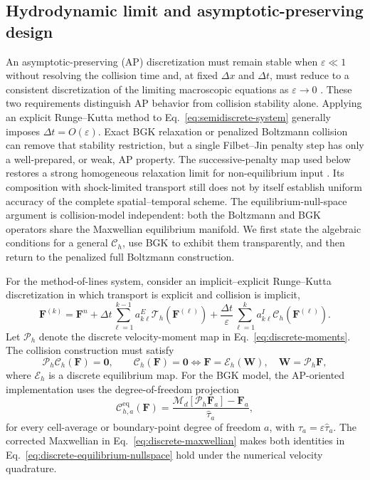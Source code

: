 \documentclass[preprint,3p,12pt]{elsarticle}
\newcommand{\vct}[1]{\boldsymbol{#1}}
\begin{document}
\subsection{Hydrodynamic limit and asymptotic-preserving design}
\label{sec:ap-analysis}

An asymptotic-preserving (AP) discretization must remain stable when $\varepsilon\ll1$ without resolving the collision time and, at fixed $\Delta x$ and $\Delta t$, must reduce to a consistent discretization of the limiting macroscopic equations as $\varepsilon\to0$ \cite{filbet2010ap,dimarco2013imex}. These two requirements distinguish AP behavior from collision stability alone. Applying an explicit Runge--Kutta method to Eq.~\eqref{eq:semidiscrete-system} generally imposes $\Delta t=O(\varepsilon)$. Exact BGK relaxation or penalized Boltzmann collision can remove that stability restriction, but a single Filbet--Jin penalty step has only a well-prepared, or weak, AP property. The successive-penalty map used below restores a strong homogeneous relaxation limit for non-equilibrium input \cite{yan2013successive}. Its composition with shock-limited transport still does not by itself establish uniform accuracy of the complete spatial--temporal scheme. The equilibrium-null-space argument is collision-model independent: both the Boltzmann and BGK operators share the Maxwellian equilibrium manifold. We first state the algebraic conditions for a general $\mathcal{C}_h$, use BGK to exhibit them transparently, and then return to the penalized full Boltzmann construction.

For the method-of-lines system, consider an implicit--explicit Runge--Kutta discretization in which transport is explicit and collision is implicit,
\begin{equation}
  \vct{F}^{(k)}
  =\vct{F}^{n}
  +\Delta t\sum_{\ell=1}^{k-1}a^{E}_{k\ell}
     \mathcal{T}_h\left(\vct{F}^{(\ell)}\right)
  +\frac{\Delta t}{\varepsilon}
   \sum_{\ell=1}^{k}a^{I}_{k\ell}
     \mathcal{C}_h\left(\vct{F}^{(\ell)}\right).
  \label{eq:imex-stage}
\end{equation}
Let $\mathcal{P}_h$ denote the discrete velocity-moment map in Eq.~\eqref{eq:discrete-moments}. The collision construction must satisfy
\begin{equation}
  \mathcal{P}_h\mathcal{C}_h(\vct{F})=\vct{0},
  \qquad
  \mathcal{C}_h(\vct{F})=\vct{0}
  \Longleftrightarrow
  \vct{F}=\mathcal{E}_h(\vct{W}),
  \quad \vct{W}=\mathcal{P}_h\vct{F},
  \label{eq:discrete-equilibrium-nullspace}
\end{equation}
where $\mathcal{E}_h$ is a discrete equilibrium map. For the BGK model, the AP-oriented implementation uses the degree-of-freedom projection
\begin{equation}
  \mathcal{C}_{h,a}^{\mathrm{eq}}(\vct{F})
  =\frac{
  \mathcal{M}_d[\mathcal{P}_h\vct{F}_a]-\vct{F}_a}
  {\widehat{\tau}_a},
  \label{eq:equilibrium-projection-collision}
\end{equation}
for every cell-average or boundary-point degree of freedom $a$, with $\tau_a=\varepsilon\widehat{\tau}_a$. The corrected Maxwellian in Eq.~\eqref{eq:discrete-maxwellian} makes both identities in Eq.~\eqref{eq:discrete-equilibrium-nullspace} hold under the numerical velocity quadrature.
\end{document}
